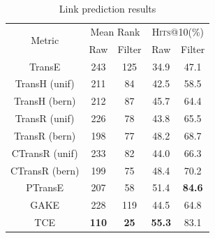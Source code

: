 \begin{table} %
  \caption{Link prediction results}
  \label{table_link_prediction_results}
  \begin{tabular}{c|cc|cc}
    \hline
    \multirow{2}{*}{Metric}  & \multicolumn{2}{c|}{Mean Rank} & \multicolumn{2}{c}{\textsc{Hits}@10(\%)} \\
                             & Raw          & Filter          & Raw           & Filter          \\
    \hline
    TransE                   & 243          & 125             & 34.9          & 47.1            \\
    TransH (unif)            & 211          & 84              & 42.5          & 58.5            \\
    TransH (bern)            & 212          & 87              & 45.7          & 64.4            \\
    TransR (unif)            & 226          & 78              & 43.8          & 65.5            \\
    TransR (bern)            & 198          & 77              & 48.2          & 68.7            \\
    CTransR (unif)           & 233          & 82              & 44.0          & 66.3            \\
    CTransR (bern)           & 199          & 75              & 48.4          & 70.2            \\
    PTransE                  & 207          & 58              & 51.4          & \textbf{84.6}   \\
    GAKE                     & 228          & 119             & 44.5          & 64.8            \\
    \hline
    TCE                      & \textbf{110} & \textbf{25}     & \textbf{55.3} & 83.1            \\
    \hline
  \end{tabular}
\end{table}

